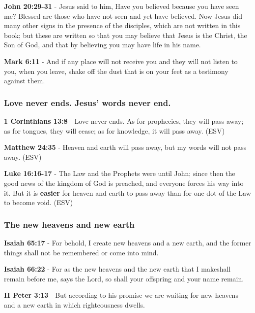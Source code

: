 \documentclass[11pt]{article}
\begin{document}
\textbf{John 20:29-31} - Jesus said to him, Have you believed because you have seen me? Blessed are those who have not seen and yet have believed.  Now Jesus did many other signs in the presence of the disciples, which are not written in this book; but these are written so that you may believe that Jesus is the Christ, the Son of God, and that by believing you may have life in his name.

\textbf{Mark 6:11} - And if any place will not receive you and they will not listen to you, when you leave, shake off the dust that is on your feet as a testimony against them.

\subsubsection{Love never ends. Jesus' words never end.}
\label{sec:org28cedce}
\textbf{1 Corinthians 13:8} -  Love never ends.  As for prophecies, they will pass away; as for tongues, they will cease; as for knowledge, it will pass away. (ESV)

\textbf{Matthew 24:35} - Heaven and earth will pass away, but my words will not pass away. (ESV)

\textbf{Luke 16:16-17} -  The Law and the Prophets were until John; since then the good news of the kingdom of God is preached, and everyone forces his way into it.  But it is \textbf{easier} for heaven and earth to pass away than for one dot of the Law to become void. (ESV)

\subsubsection{The new heavens and new earth}
\label{sec:org6808478}
\textbf{Isaiah 65:17} - For behold, I create new heavens and a new earth, and the former things shall not be remembered or come into mind.

\textbf{Isaiah 66:22} - For as the new heavens and the new earth that I makeshall remain before me, says the Lord, so shall your offspring and your name remain.

\textbf{II Peter 3:13} - But according to his promise we are waiting for new heavens and a new earth in which righteousness dwells.
\end{document}
